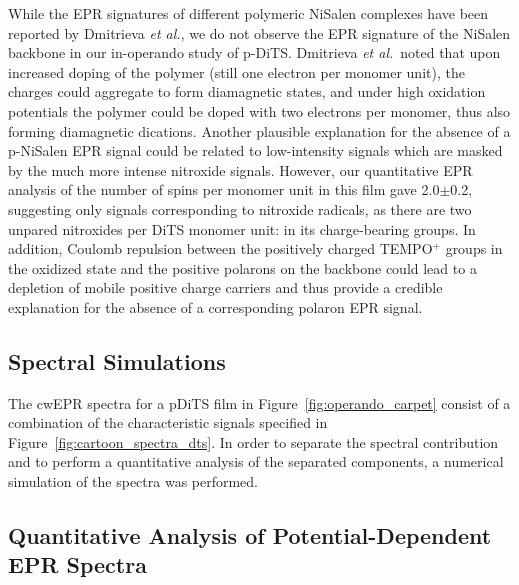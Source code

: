 \par
While the EPR signatures of different polymeric NiSalen complexes have been reported by Dmitrieva \textit{et al.},\cite{Dmitrieva2018} we do not observe the EPR signature of the NiSalen backbone in our in-operando study of p-DiTS. Dmitrieva \textit{et al.}\ noted that upon increased doping of the polymer (still one electron per monomer unit), the charges could aggregate to form diamagnetic states, and under high oxidation potentials the polymer could be doped with two electrons per monomer, thus also forming diamagnetic dications. Another plausible explanation for the absence of a p-NiSalen EPR signal could be related to low-intensity signals which are masked by the much more intense nitroxide signals. However, our quantitative EPR analysis of the number of spins per monomer unit in this film gave 2.0$\pm$0.2, suggesting only signals corresponding to nitroxide radicals, as there are two unpared nitroxides per DiTS monomer unit: in its charge-bearing groups.
In addition, Coulomb repulsion between the positively charged TEMPO$^+$ groups in the oxidized state and the positive polarons on the backbone could lead to a depletion of mobile positive charge carriers and thus provide a credible explanation for the absence of a corresponding polaron EPR signal.
%


\subsection{Spectral Simulations}
The cwEPR spectra for a pDiTS film in Figure~\ref{fig:operando_carpet} consist of a combination of the characteristic signals specified in Figure~\ref{fig:cartoon_spectra_dts}. In order to separate the spectral contribution and to perform a quantitative analysis of the separated components, a numerical simulation of the spectra was performed.


\subsection{Quantitative Analysis of Potential-Dependent EPR Spectra}
\label{sec:quantitative_EPR}


